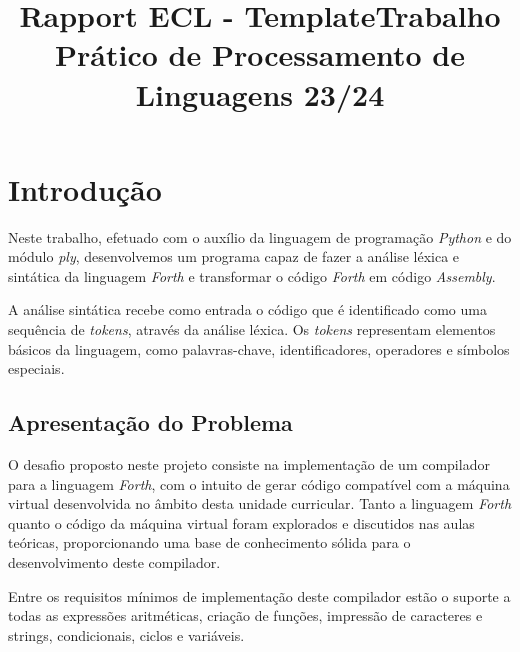 \documentclass{predef}
\title{Rapport ECL - Template}
\begin{document}
\title{Trabalho Prático de Processamento de Linguagens 23/24}






        
\makemargins %

\makecoverpage

\tableofcontents

\newpage
\section{Introdução}
Neste trabalho, efetuado com o auxílio da linguagem de programação \textit{Python} e do módulo \textit{ply}, desenvolvemos um programa capaz de fazer a análise léxica e sintática da linguagem \textit{Forth} e transformar o código \textit{Forth} em código \textit{Assembly}.

A análise sintática recebe como entrada o código que é identificado como uma sequência de \textit{tokens}, através da análise léxica. Os \textit{tokens} representam elementos básicos da linguagem, como palavras-chave, identificadores, operadores e símbolos especiais.


\subsection{Apresentação do Problema}
O desafio proposto neste projeto consiste na implementação de um compilador para a linguagem \textit{Forth}, com o intuito de gerar código compatível com a máquina virtual desenvolvida no âmbito desta unidade curricular. Tanto a linguagem \textit{Forth} quanto o código da máquina virtual foram explorados e discutidos nas aulas teóricas, proporcionando uma base de conhecimento sólida para o desenvolvimento deste compilador.

Entre os requisitos mínimos de implementação deste compilador estão o suporte a todas as expressões aritméticas, criação de funções, impressão de caracteres e strings, condicionais, ciclos e variáveis.
\end{document}
